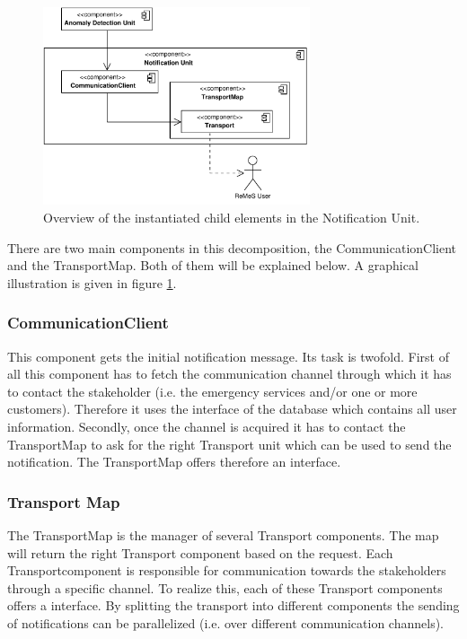\begin{figure}[H]
	\begin{centering}
		\includegraphics[width=0.7\textwidth]{figs/add-it8-elements.pdf}
		\caption{Overview of the instantiated child elements in the Notification
		Unit.}
		\label{fig:it8/elements}
	\end{centering}
\end{figure}

\npar There are two main components in this decomposition, the
CommunicationClient and the TransportMap. Both of them will be explained below.
A graphical illustration is given in figure \ref{fig:it8/elements}.

\subsubsection{CommunicationClient} 

\npar This component gets the initial notification message. Its task is
twofold. First of all this component has to fetch the communication channel
through which it has to contact the stakeholder (i.e. the emergency services
and/or one or more customers). Therefore it uses the
 interface of the database which contains all user
information. Secondly, once the channel is acquired it has to contact the
TransportMap to ask for the right Transport unit which can be used to send the
notification. The TransportMap offers therefore an 
interface.

\subsubsection{Transport Map}

\npar The TransportMap is the manager of several Transport components. The
map will return the right Transport component based on the request. Each
Transportcomponent is responsible for communication towards the stakeholders
through a specific channel. To realize this, each of these Transport components
offers a  interface. By splitting the transport into
different components the sending of notifications can be parallelized (i.e. over
different communication channels).

